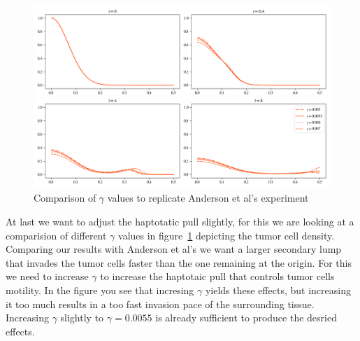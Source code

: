 \begin{figure}[!htb]
    \centering
    \includegraphics[width=\textwidth]{resources/images/gamma_comparison.png}
    \caption{Comparison of $\gamma$ values to replicate Anderson et al's experiment}
    \label{fig:replication_gamma_comparison}
\end{figure}
At last we want to adjust the haptotatic pull slightly, for this we are looking at a comparision of different $\gamma$ values in figure~\ref{fig:replication_gamma_comparison} depicting the tumor cell density. Comparing our results with Anderson et al's we want a larger secondary lump that invades the tumor cells faster than the one remaining at the origin. For this we need to increase $\gamma$ to increase the haptotaic pull that controls tumor cells motility. In the figure you see that incresing $\gamma$ yields these effects, but increasing it too much results in a too fast invasion pace of the surrounding tissue. Increasing $\gamma$ slightly to $\gamma=0.0055$ is already sufficient to produce the desried effects.\newline

